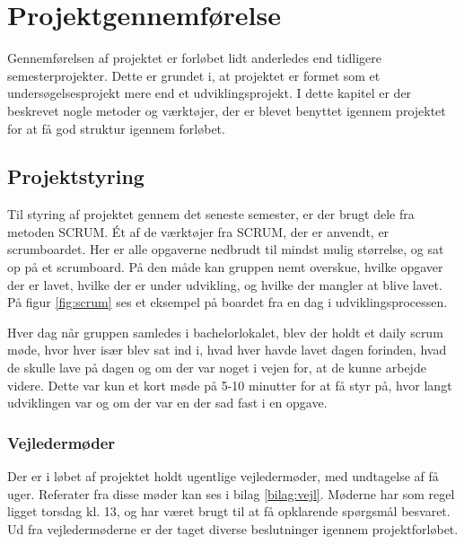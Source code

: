 \thispagestyle{fancy}
\chapter{Projektgennemførelse}
\label{chp:projektgennemforsel}

Gennemførelsen af projektet er forløbet lidt anderledes end tidligere semesterprojekter. Dette er grundet i, at projektet er formet som et undersøgelsesprojekt mere end et udviklingsprojekt. I dette kapitel er der beskrevet nogle metoder og værktøjer, der er blevet benyttet igennem projektet for at få god struktur igennem forløbet.

\section{Projektstyring}
\label{sec:projektstyring}

Til styring af projektet gennem det seneste semester, er der brugt dele fra metoden SCRUM.
Ét af de værktøjer fra SCRUM, der er anvendt, er scrumboardet. Her er alle opgaverne nedbrudt til mindst mulig størrelse, og sat op på et scrumboard. På den måde kan gruppen nemt overskue, hvilke opgaver der er lavet, hvilke der er under udvikling, og hvilke der mangler at blive lavet. På figur \ref{fig:scrum} ses et eksempel på boardet fra en dag i udviklingsprocessen. 


Hver dag når gruppen samledes i bachelorlokalet, blev der holdt et daily scrum møde, hvor hver især blev sat ind i, hvad hver havde lavet dagen forinden, hvad de skulle lave på dagen og om der var noget i vejen for, at de kunne arbejde videre. Dette var kun et kort møde på 5-10 minutter for at få styr på, hvor langt udviklingen var og om der var en der sad fast i en opgave.

\subsection{Vejledermøder}
Der er i løbet af projektet holdt ugentlige vejledermøder, med undtagelse af få uger. Referater fra disse møder kan ses i bilag \ref{bilag:vejl}. Møderne har som regel ligget torsdag kl. 13, og har været brugt til at få opklarende spørgsmål besvaret. Ud fra vejledermøderne er der taget diverse beslutninger igennem projektforløbet.

